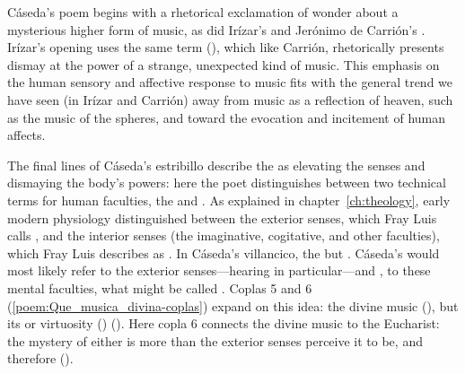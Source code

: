 % 	

% 	

Cáseda's poem begins with a rhetorical exclamation of wonder about a mysterious higher form of music, as did Irízar's  and Jerónimo de Carrión's .
Irízar's opening uses the same term (), which like Carrión, rhetorically presents dismay at the power of a strange, unexpected kind of music.
This emphasis on the human sensory and affective response to music fits with the general trend we have seen (in Irízar and Carrión) away from music as a reflection of heaven, such as the music of the spheres, and toward the evocation and incitement of human affects.

The final lines of Cáseda's estribillo describe the  as elevating the senses and dismaying the body's powers: here the poet distinguishes between two technical terms for human faculties, the  and .
As explained in chapter~\ref{ch:theology}, early modern physiology distinguished between the exterior senses, which Fray Luis calls , and the interior senses (the imaginative, cogitative, and other faculties), which Fray Luis describes as .
In Cáseda's villancico, the   but .
Cáseda's  would most likely refer to the exterior senses---hearing in particular---and , to these mental faculties, what might be called .
Coplas 5 and 6 (\cref{poem:Que_musica_divina-coplas}) expand on this idea: the divine music  (), but its  or virtuosity ()  ().
Here copla 6 connects the divine music to the Eucharist: the mystery of either is more than the exterior senses perceive it to be, and therefore  ().

